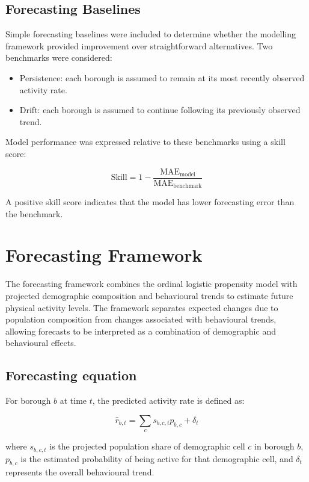 \documentclass[ %
                    author={Ashrey Ashrey, Sanya Kapoor, Trisha Sharma, Yash Bhooshan Pandloskar},
                supervisor={Dr. Dalila O’Grady},
                    degree={MSc},
                     title={Using machine learning to forecast physical activity participation, volunteering and activity patterns in London},
                  subtitle={},
                      type={},
                      year={2021}]{dissertation}
\begin{document}
\FloatBarrier
\subsection{Forecasting Baselines}

\noindent
Simple forecasting baselines were included to determine whether the modelling framework provided improvement over straightforward alternatives. Two benchmarks were considered:

\begin{itemize}
\item Persistence: each borough is assumed to remain at its most recently observed activity rate.
\item Drift: each borough is assumed to continue following its previously observed trend.
\end{itemize}

Model performance was expressed relative to these benchmarks using a skill score:

\[
\mathrm{Skill}
=
1-
\frac{\mathrm{MAE}_{\mathrm{model}}}
{\mathrm{MAE}_{\mathrm{benchmark}}}
\]

A positive skill score indicates that the model has lower forecasting error than the benchmark.

\FloatBarrier
\section{Forecasting Framework}

\noindent
The forecasting framework combines the ordinal logistic propensity model with projected demographic composition and behavioural trends to estimate future physical activity levels. The framework separates expected changes due to population composition from changes associated with behavioural trends, allowing forecasts to be interpreted as a combination of demographic and behavioural effects.

\FloatBarrier
\subsection{Forecasting equation}

\noindent
For borough \(b\) at time \(t\), the predicted activity rate is defined as:

\[
\widehat{r}_{b,t}
=
\sum_{c} s_{b,c,t}p_{b,c}
+
\delta_t
\]

where \(s_{b,c,t}\) is the projected population share of demographic cell \(c\) in borough \(b\), \(p_{b,c}\) is the estimated probability of being active for that demographic cell, and \(\delta_t\) represents the overall behavioural trend.
\end{document}
